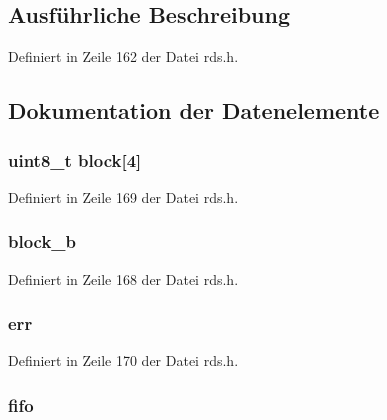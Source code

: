 \subsection{Ausführliche Beschreibung}


Definiert in Zeile 162 der Datei rds.\+h.



\subsection{Dokumentation der Datenelemente}
\hypertarget{structrds_af966591bcdc65611d3f9ec47cd36d52a}{}
\subsubsection[{block}]{\setlength{\rightskip}{0pt plus 5cm}uint8\+\_\+t block\mbox{[}4\mbox{]}}\label{structrds_af966591bcdc65611d3f9ec47cd36d52a}


Definiert in Zeile 169 der Datei rds.\+h.

\hypertarget{structrds_ad8c59b1a87492b568b0bf85aef6f5f87}{}
\subsubsection[{block\+\_\+b}]{ {\bf block\+\_\+b}}\label{structrds_ad8c59b1a87492b568b0bf85aef6f5f87}


Definiert in Zeile 168 der Datei rds.\+h.

\hypertarget{structrds_a533130a85d028e42078891666dd6c6fc}{}
\subsubsection[{err}]{ {\bf err}}\label{structrds_a533130a85d028e42078891666dd6c6fc}


Definiert in Zeile 170 der Datei rds.\+h.

\hypertarget{structrds_a7f4b3988a39d63bbb74e44a08285d9ef}{}
\subsubsection[{fifo}]{ {\bf fifo}}\label{structrds_a7f4b3988a39d63bbb74e44a08285d9ef}


